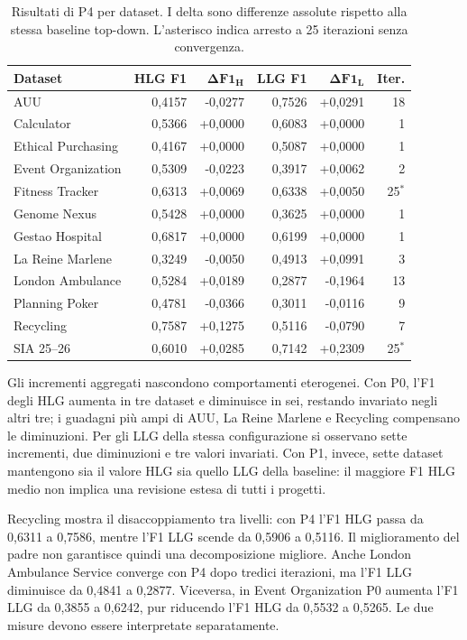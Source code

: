 \begin{table}[htbp]
\centering
\small
\caption{Risultati di P4 per dataset. I delta sono differenze assolute rispetto alla stessa baseline top-down. L'asterisco indica arresto a 25 iterazioni senza convergenza.}
\label{tab:results-P4-datasets}
\begin{tabular}{lrrrrr}
\toprule
\textbf{Dataset} & \textbf{HLG F1} & $\boldsymbol{\Delta F1_H}$ & \textbf{LLG F1} & $\boldsymbol{\Delta F1_L}$ & \textbf{Iter.} \\
\midrule
AUU & 0,4157 & -0,0277 & 0,7526 & +0,0291 & 18 \\
Calculator & 0,5366 & +0,0000 & 0,6083 & +0,0000 & 1 \\
Ethical Purchasing & 0,4167 & +0,0000 & 0,5087 & +0,0000 & 1 \\
Event Organization & 0,5309 & -0,0223 & 0,3917 & +0,0062 & 2 \\
Fitness Tracker & 0,6313 & +0,0069 & 0,6338 & +0,0050 & 25$^{*}$ \\
Genome Nexus & 0,5428 & +0,0000 & 0,3625 & +0,0000 & 1 \\
Gestao Hospital & 0,6817 & +0,0000 & 0,6199 & +0,0000 & 1 \\
La Reine Marlene & 0,3249 & -0,0050 & 0,4913 & +0,0991 & 3 \\
London Ambulance & 0,5284 & +0,0189 & 0,2877 & -0,1964 & 13 \\
Planning Poker & 0,4781 & -0,0366 & 0,3011 & -0,0116 & 9 \\
Recycling & 0,7587 & +0,1275 & 0,5116 & -0,0790 & 7 \\
SIA 25--26 & 0,6010 & +0,0285 & 0,7142 & +0,2309 & 25$^{*}$ \\
\bottomrule
\end{tabular}
\end{table}


Gli incrementi aggregati nascondono comportamenti eterogenei.
Con P0, l'F1 degli HLG aumenta in tre dataset e diminuisce in sei,
restando invariato negli altri tre; i guadagni pi\`u ampi di AUU,
La Reine Marlene e Recycling compensano le diminuzioni.
Per gli LLG della stessa configurazione si osservano sette incrementi,
due diminuzioni e tre valori invariati. Con P1, invece, sette dataset
mantengono sia il valore HLG sia quello LLG della baseline: il maggiore
F1 HLG medio non implica una revisione estesa di tutti i progetti.

Recycling mostra il disaccoppiamento tra livelli: con P4 l'F1 HLG
passa da 0,6311 a 0,7586, mentre l'F1 LLG scende da 0,5906 a 0,5116.
Il miglioramento del padre non garantisce quindi una decomposizione
migliore. Anche London Ambulance Service converge con P4 dopo tredici
iterazioni, ma l'F1 LLG diminuisce da 0,4841 a 0,2877.
Viceversa, in Event Organization P0 aumenta l'F1 LLG da 0,3855 a
0,6242, pur riducendo l'F1 HLG da 0,5532 a 0,5265.
Le due misure devono essere interpretate separatamente.

